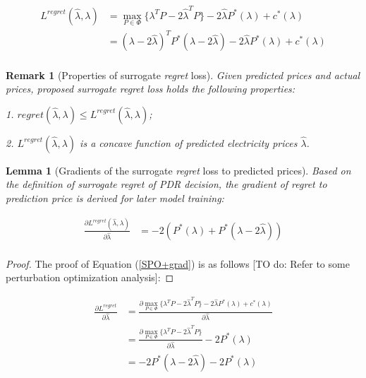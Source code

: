 \documentclass[journal]{IEEEtran}
\newtheorem{remark}{Remark}
\newtheorem{lemma}{Lemma}
\begin{document}
\begin{equation}
  \label{lossofregret2}
  \begin{aligned}
    L^{regret}(\hat{\lambda}, \lambda) &= \max_{P\in \Phi} \{ \lambda^T P - 2 \hat{\lambda}^T P \} - 2 \hat{\lambda} P^*(\lambda) + c^*(\lambda)  \\
    &= (\lambda - 2 \hat{\lambda})^T P^*(\lambda - 2 \hat{\lambda}) - 2 \hat{\lambda} P^*(\lambda) + c^*(\lambda) \\
  \end{aligned}
\end{equation}

\begin{remark}[Properties of surrogate \textit{regret} loss]
  Given predicted prices and actual prices, proposed surrogate regret loss holds the following properties:

  1. $regret(\hat{\lambda}, \lambda) \leq L^{regret}(\hat{\lambda}, \lambda)$;

  2. $L^{regret}(\hat{\lambda}, \lambda)$ is a concave function of predicted electricity prices $\hat{\lambda}$.
\end{remark}


\begin{lemma}[Gradients of the surrogate \textit{regret} loss to predicted prices]
Based on the definition of surrogate regret of PDR decision, the gradient of regret to prediction price  is derived for later model training:
\end{lemma}
\begin{equation}
  \label{SPO+grad}
  \begin{aligned}
    \frac{\partial L^{regret}(\hat{\lambda}, \lambda)}{\partial \hat{\lambda}} &= - 2 (P^*(\lambda) + P^*( \lambda - 2\hat{\lambda}))\\ 
  \end{aligned}
\end{equation}

\begin{proof}
  The proof of Equation (\ref{SPO+grad}) is as follows [TO do: Refer to some perturbation optimization analysis]:
\end{proof}
\begin{equation*}
  \label{SPO+proof}
  \begin{aligned}
    \frac{\partial L^{regret}}{\partial \hat{\lambda}} &= \frac{\partial \max_{P\in \Phi} \{ \lambda^T P - 2 \hat{\lambda}^T P \} - 2 \hat{\lambda} P^*(\lambda) + c^*(\lambda)}{\partial \hat{\lambda}} \\ 
    &= \frac{\partial \max_{P\in \Phi} \{ \lambda^T P - 2 \hat{\lambda}^T P \}}{\partial \hat{\lambda}} - 2 P^*(\lambda) \\
    &= -2 P^*(\lambda - 2 \hat{\lambda}) - 2 P^*(\lambda)
  \end{aligned}
\end{equation*}
\end{document}

